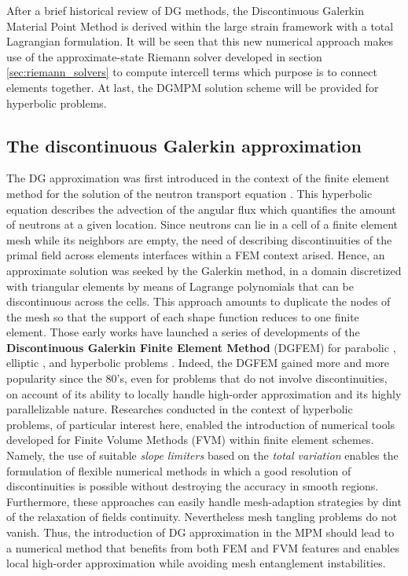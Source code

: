 After a brief historical review of DG methods, the Discontinuous Galerkin Material Point Method is derived within the large strain framework with a total Lagrangian formulation. It will be seen that this new numerical approach makes use of the approximate-state Riemann solver developed in section \ref{sec:riemann_solvers} to compute intercell terms which purpose is to connect elements together. At last, the DGMPM solution scheme will be provided for hyperbolic problems.

\subsection{The discontinuous Galerkin approximation}
The DG approximation was first introduced in the context of the finite element method for the solution of the neutron transport equation \cite{NeutronDG}. This hyperbolic equation describes the advection of the angular flux which quantifies the amount of neutrons at a given location. Since neutrons can lie in a cell of a finite element mesh while its neighbors are empty, the need of describing discontinuities of the primal field across elements interfaces within a FEM context arised. Hence, an approximate solution was seeked by the Galerkin method, in a domain discretized with triangular elements by means of Lagrange polynomials that can be discontinuous across the cells. This approach amounts to duplicate the nodes of the mesh so that the support of each shape function reduces to one finite element. Those early works have launched a series of developments of the \textbf{Discontinuous Galerkin Finite Element Method} (DGFEM) for parabolic \cite{Arnold_IPM}, elliptic \cite{Hansbo_DGsolid,Noel_HEDG}, and hyperbolic problems \cite{Cockburn}. Indeed, the DGFEM gained more and more popularity since the 80's, even for problems that do not involve discontinuities, on account of its ability to locally handle high-order approximation and its highly parallelizable nature. 
Researches conducted in the context of hyperbolic problems, of particular interest here, enabled the introduction of numerical tools developed for Finite Volume Methods (FVM) within finite element schemes.
Namely, the use of suitable \textit{slope limiters} \cite{vanLeer_Limiters} based on the \textit{total variation} \cite{Harten_TVD} enables the formulation of flexible numerical methods in which a good resolution of discontinuities is possible without destroying the accuracy in smooth regions. Furthermore, these approaches can easily handle mesh-adaption strategies by dint of the relaxation of fields continuity. Nevertheless mesh tangling problems do not vanish.
Thus, the introduction of DG approximation in the MPM should lead to a numerical method that benefits from both FEM and FVM features and enables local high-order approximation while avoiding mesh entanglement instabilities.


